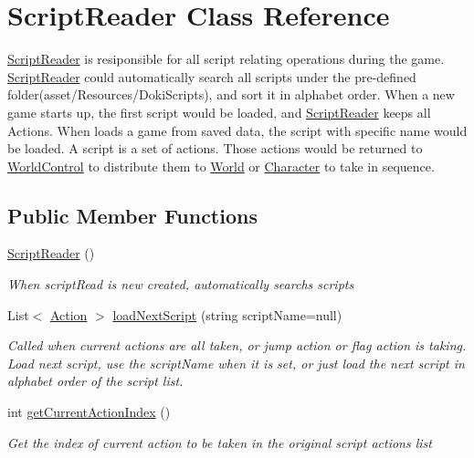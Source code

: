 \hypertarget{class_script_reader}{}\section{Script\+Reader Class Reference}
\label{class_script_reader}


\hyperlink{class_script_reader}{Script\+Reader} is resiponsible for all script relating operations during the game. \hyperlink{class_script_reader}{Script\+Reader} could automatically search all scripts under the pre-\/defined folder(asset/\+Resources/\+Doki\+Scripts), and sort it in alphabet order. When a new game starts up, the first script would be loaded, and \hyperlink{class_script_reader}{Script\+Reader} keeps all Actions. When loads a game from saved data, the script with specific name would be loaded. A script is a set of actions. Those actions would be returned to \hyperlink{class_world_control}{World\+Control} to distribute them to \hyperlink{class_world}{World} or \hyperlink{class_character}{Character} to take in sequence.  


\subsection*{Public Member Functions}
\begin{DoxyCompactItemize}
\item 
\hyperlink{class_script_reader_a2c82ee783650e92155ce7c967dd3ec35}{Script\+Reader} ()
\begin{DoxyCompactList}\small\item\em When script\+Read is new created, automatically searchs scripts \end{DoxyCompactList}\item 
List$<$ \hyperlink{classdoki_script_setting_1_1_action}{Action} $>$ \hyperlink{class_script_reader_a2703b42aeba068c816b799e18643e329}{load\+Next\+Script} (string script\+Name=null)
\begin{DoxyCompactList}\small\item\em Called when current actions are all taken, or jump action or flag action is taking. Load next script, use the script\+Name when it is set, or just load the next script in alphabet order of the script list. \end{DoxyCompactList}\item 
int \hyperlink{class_script_reader_a090a3839aa5da85a65bcd548a2c2e23f}{get\+Current\+Action\+Index} ()
\begin{DoxyCompactList}\small\item\em Get the index of current action to be taken in the original script actions\textquotesingle{} list \end{DoxyCompactList}\end{DoxyCompactItemize}
